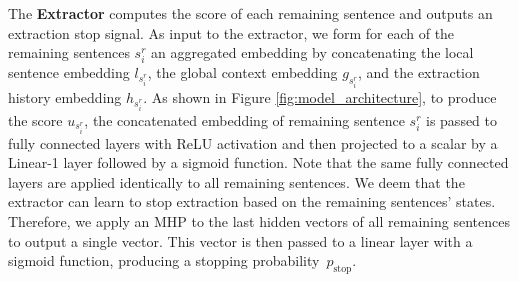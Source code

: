 \documentclass[11pt]{article}
\begin{document}
The \textbf{Extractor} computes the score of each remaining sentence and outputs an extraction stop signal. As input to the extractor, we form for each of the remaining sentences $s^r_i$ an aggregated embedding by concatenating the local sentence embedding $l_{s^r_i}$, the global context embedding $g_{s^r_i}$, and the extraction history embedding $h_{s^r_i}$. As shown in Figure \ref{fig:model_architecture}, to produce the score $u_{s^r_i}$, the concatenated embedding of remaining sentence $s^r_i$ is passed to fully connected layers with ReLU activation and then projected to a scalar by a Linear-1 layer followed by a sigmoid function. Note that the same fully connected layers are applied identically to all remaining sentences. We deem that the extractor can learn to stop extraction based on the remaining sentences' states. Therefore, we apply an MHP to the last hidden vectors of all remaining sentences to output a single vector. This vector is then passed to a linear layer with a sigmoid function, producing a stopping probability~$p_\text{stop}$.
\end{document}
